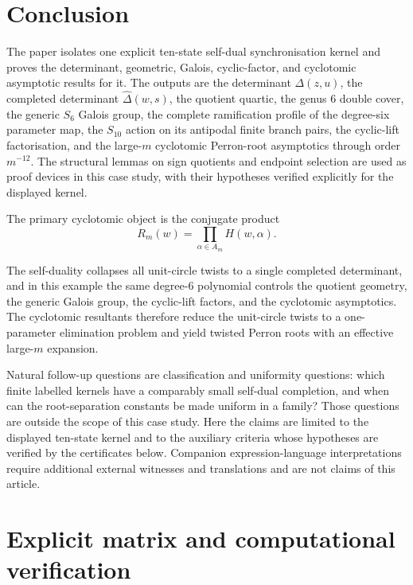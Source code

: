 \section{Conclusion}\label{sec:conclusion}

The paper isolates one explicit ten-state self-dual synchronisation
kernel and proves the determinant, geometric, Galois, cyclic-factor,
and cyclotomic asymptotic results for it.  The outputs are the
determinant \(\Delta(z,u)\),
the completed determinant \(\widehat\Delta(w,s)\), the quotient quartic,
the genus \(6\) double cover, the generic \(S_6\) Galois group, the
complete ramification profile of the degree-six parameter map, the
\(S_{10}\) action on its antipodal finite branch pairs, the cyclic-lift
factorisation, and the large-\(m\) cyclotomic Perron-root asymptotics
through order \(m^{-12}\).  The structural lemmas on sign
quotients and endpoint selection are used as proof devices in this
case study, with their hypotheses verified explicitly for the displayed
kernel.

The primary cyclotomic object is the conjugate product
\[
  R_m(w)=\prod_{\alpha\in A_m}H(w,\alpha).
\]

The self-duality collapses all unit-circle twists to a single completed
determinant, and in this example the same degree-\(6\) polynomial
controls the quotient geometry, the generic Galois group, the
cyclic-lift factors, and the cyclotomic asymptotics.  The cyclotomic
resultants therefore reduce the unit-circle twists to a one-parameter
elimination problem and yield twisted Perron roots with an effective
large-\(m\) expansion.

Natural follow-up questions are classification and uniformity questions:
which finite labelled kernels have a comparably small self-dual
completion, and when can the root-separation constants be made uniform
in a family?  Those questions are outside the scope of this case study.
Here the claims are limited to the displayed ten-state kernel and to the
auxiliary criteria whose hypotheses are verified by the certificates
below.  Companion expression-language interpretations require additional
external witnesses and translations and are not claims of this article.

\appendix

\section{Explicit matrix and computational verification}
\label{sec:appendix-computation}

